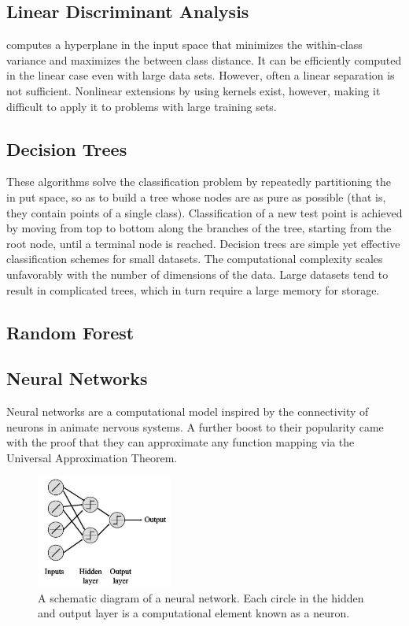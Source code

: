 \documentclass[12pt]{article}
\numberwithin{equation}{section}
\numberwithin{table}{section}
\numberwithin{figure}{section}
\begin{document}
\subsection{Linear Discriminant Analysis} \label{lda}
computes a hyperplane in the input space that minimizes the within-class variance and maximizes the between class distance. It can be efficiently computed in the linear case even with large data sets. However, often a linear separation is not sufficient. Nonlinear extensions by using kernels exist, however, making it difficult to apply it to problems with large training sets.

\subsection{Decision Trees} \label{dectree}
These algorithms solve the classification problem by repeatedly partitioning the in put space, so as to build a tree whose nodes are as pure as possible (that is, they contain points of a single class). Classification of a
new test point is achieved by moving from top to bottom along the branches of the tree, starting from the root node, until a terminal node is reached. Decision trees are simple yet effective classification schemes for small datasets. The computational complexity scales unfavorably with the number of dimensions of the data. Large datasets tend to result in complicated trees, which in turn require a large memory for storage. 

\subsection{Random Forest} \label{dectree}




\subsection{Neural Networks} \label{neuralnetwork}

Neural networks are a computational model inspired by the connectivity of neurons in animate nervous systems.
A further boost to their popularity came with the proof that they can approximate any function mapping via the Universal Approximation Theorem. 

\begin{figure}[H] \centering
	\includegraphics[width=0.4\textwidth]{image5.png}
	\caption{A schematic diagram of a neural network. Each circle in the hidden and output layer is a computational element known as a neuron. }
	\label{figure5}
\end{figure}
\end{document}
